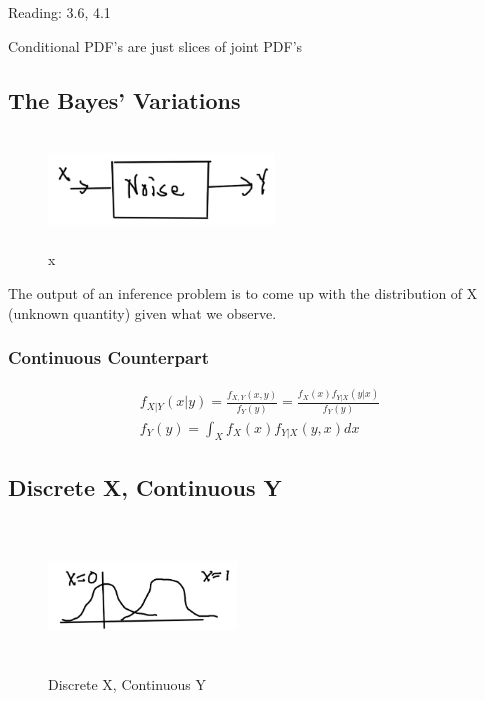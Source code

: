 
Reading: 3.6, 4.1



Conditional PDF's are just slices of joint PDF's

\subsection{The Bayes' Variations}


\begin{figure}[ht]
\centering
\includegraphics[width=6cm, height=3cm]{images/L10/noise_model.jpeg}
\caption{x}
\end{figure}


The output of an inference problem is to come up with the distribution of X (unknown quantity) given what we observe.

\subsubsection{Continuous Counterpart}

\begin{align*}
f_{X|Y}(x|y) = \frac{f_{X,Y}(x,y)}{f_Y(y)}  = \frac{f_X(x) f_{Y|X}(y|x)}{f_Y(y)}\\
f_Y(y) = \int_X f_X(x) f_{Y|X}(y,x)dx
\end{align*}

\subsection{Discrete X, Continuous Y}


\begin{figure}[ht]
\centering
\includegraphics[width=5cm, height=4cm]{images/L10/discrete_continuous.jpeg}
\caption{Discrete X, Continuous Y}
\end{figure}

